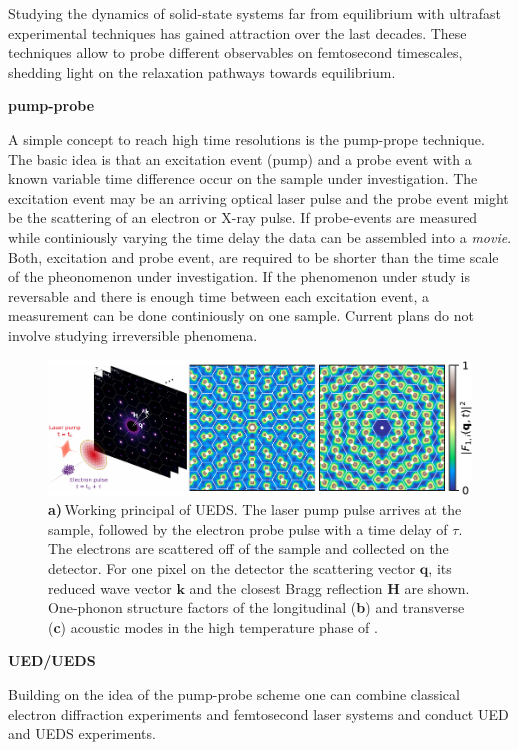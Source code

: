 Studying the dynamics of solid-state systems far from equilibrium with ultrafast experimental techniques has gained attraction over the last decades.
These techniques allow to probe different observables on femtosecond timescales, shedding light on the relaxation pathways towards equilibrium.

\textbf{pump-probe}

A simple concept to reach high time resolutions is the pump-prope technique.
The basic idea is that an excitation event (pump) and a probe event with a known variable time difference occur on the sample under investigation.
The excitation event may be an arriving optical laser pulse and the probe event might be the scattering of an electron or X-ray pulse.
If probe-events are measured while continiously varying the time delay the data can be assembled into a \emph{movie}.
Both, excitation and probe event, are required to be shorter than the time scale of the pheonomenon under investigation.
If the phenomenon under study is reversable and there is enough time between each excitation event, a measurement can be done continiously on one sample.
Current plans do not involve studying irreversible phenomena.

\begin{figure}[!t]
	\includegraphics[width=\columnwidth]{figs/method.pdf}
	\caption{\textbf{a)}\,Working principal of \acs{UEDS}. The laser pump pulse arrives at the sample, followed by the electron probe pulse with a time delay of $\tau$. The electrons are scattered off of the sample and collected on the detector. For one pixel on the detector the scattering vector $\mathbf{q}$, its reduced wave vector $\mathbf{k}$ and the closest Bragg reflection $\mathbf{H}$ are shown. One-phonon structure factors of the longitudinal (\textbf{b}) and transverse (\textbf{c}) acoustic modes in the high temperature phase of \ts.}
	\label{fig:method}
\end{figure}

\textbf{UED/UEDS}

Building on the idea of the pump-probe scheme one can combine classical electron diffraction experiments and femtosecond laser systems and conduct \ac{UED} and \ac{UEDS} experiments.

